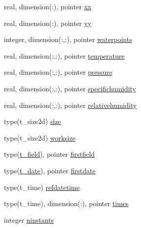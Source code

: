 \begin{DoxyCompactItemize}
\item 
real, dimension(\+:), pointer \mbox{\hyperlink{structmodulealadinformat_1_1t__aladinformat_ab6097b2544221cfb688427105e54c6c5}{xx}}
\item 
real, dimension(\+:), pointer \mbox{\hyperlink{structmodulealadinformat_1_1t__aladinformat_ab7c1d357645b390ec812866d643c4f73}{yy}}
\item 
integer, dimension(\+:,\+:), pointer \mbox{\hyperlink{structmodulealadinformat_1_1t__aladinformat_aba03adf712726c4f2dc7c9f490ca801d}{waterpoints}}
\item 
real, dimension(\+:,\+:), pointer \mbox{\hyperlink{structmodulealadinformat_1_1t__aladinformat_a7a024800f0d4ead784aa7a556549ddb4}{temperature}}
\item 
real, dimension(\+:,\+:), pointer \mbox{\hyperlink{structmodulealadinformat_1_1t__aladinformat_a7e53127ab1db306b2bffa973ea9c3e32}{pressure}}
\item 
real, dimension(\+:,\+:), pointer \mbox{\hyperlink{structmodulealadinformat_1_1t__aladinformat_ac3dbfdb5ead05e2fdada490559f6461c}{specifichumidity}}
\item 
real, dimension(\+:,\+:), pointer \mbox{\hyperlink{structmodulealadinformat_1_1t__aladinformat_a55a85224889bd331b56da3f63649c83b}{relativehumidity}}
\item 
type(t\+\_\+size2d) \mbox{\hyperlink{structmodulealadinformat_1_1t__aladinformat_ae7db2ac964494750e5b0c55e5f2c7b04}{size}}
\item 
type(t\+\_\+size2d) \mbox{\hyperlink{structmodulealadinformat_1_1t__aladinformat_a516ad65435bbea9ecf789c9f7aa1664f}{worksize}}
\item 
type(\mbox{\hyperlink{structmodulealadinformat_1_1t__field}{t\+\_\+field}}), pointer \mbox{\hyperlink{structmodulealadinformat_1_1t__aladinformat_a3a4433b7f7b4faf41d5ae182cd1ecdbb}{firstfield}}
\item 
type(\mbox{\hyperlink{structmodulealadinformat_1_1t__date}{t\+\_\+date}}), pointer \mbox{\hyperlink{structmodulealadinformat_1_1t__aladinformat_a78a188608603c40ed76396b91f28cf3e}{firstdate}}
\item 
type(t\+\_\+time) \mbox{\hyperlink{structmodulealadinformat_1_1t__aladinformat_acdeb858e4f0d2b29fcfe795b23eaac61}{refdatetime}}
\item 
type(t\+\_\+time), dimension(\+:), pointer \mbox{\hyperlink{structmodulealadinformat_1_1t__aladinformat_a8382797f9e9718ab7e84b17009794565}{times}}
\item 
integer \mbox{\hyperlink{structmodulealadinformat_1_1t__aladinformat_a14e1968453cfd5fd56eda51dd5258148}{ninstants}}

\end{DoxyCompactItemize}
